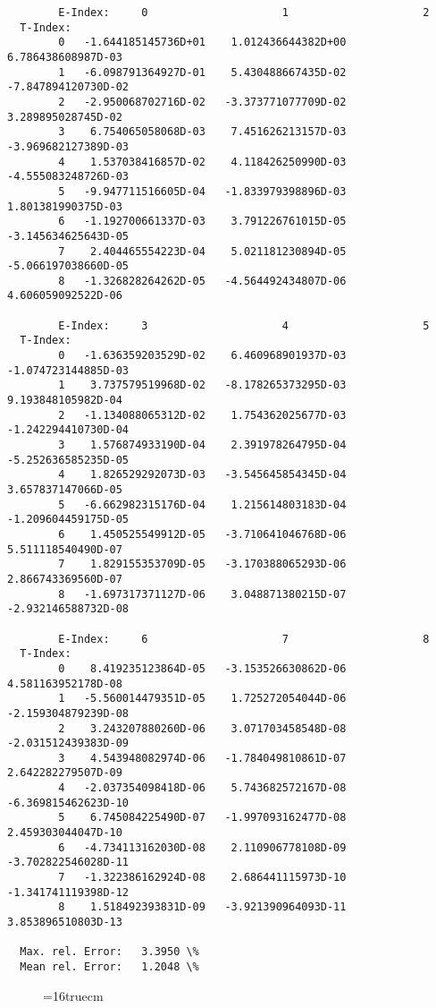 \documentclass[12pt,dvipdfmx]{article}
\begin{document}
\begin{small}\begin{verbatim}
        E-Index:     0                     1                     2
  T-Index:
        0   -1.644185145736D+01    1.012436644382D+00    6.786438608987D-03
        1   -6.098791364927D-01    5.430488667435D-02   -7.847894120730D-02
        2   -2.950068702716D-02   -3.373771077709D-02    3.289895028745D-02
        3    6.754065058068D-03    7.451626213157D-03   -3.969682127389D-03
        4    1.537038416857D-02    4.118426250990D-03   -4.555083248726D-03
        5   -9.947711516605D-04   -1.833979398896D-03    1.801381990375D-03
        6   -1.192700661337D-03    3.791226761015D-05   -3.145634625643D-05
        7    2.404465554223D-04    5.021181230894D-05   -5.066197038660D-05
        8   -1.326828264262D-05   -4.564492434807D-06    4.606059092522D-06

        E-Index:     3                     4                     5
  T-Index:
        0   -1.636359203529D-02    6.460968901937D-03   -1.074723144885D-03
        1    3.737579519968D-02   -8.178265373295D-03    9.193848105982D-04
        2   -1.134088065312D-02    1.754362025677D-03   -1.242294410730D-04
        3    1.576874933190D-04    2.391978264795D-04   -5.252636585235D-05
        4    1.826529292073D-03   -3.545645854345D-04    3.657837147066D-05
        5   -6.662982315176D-04    1.215614803183D-04   -1.209604459175D-05
        6    1.450525549912D-05   -3.710641046768D-06    5.511118540490D-07
        7    1.829155353709D-05   -3.170388065293D-06    2.866743369560D-07
        8   -1.697317371127D-06    3.048871380215D-07   -2.932146588732D-08

        E-Index:     6                     7                     8
  T-Index:
        0    8.419235123864D-05   -3.153526630862D-06    4.581163952178D-08
        1   -5.560014479351D-05    1.725272054044D-06   -2.159304879239D-08
        2    3.243207880260D-06    3.071703458548D-08   -2.031512439383D-09
        3    4.543948082974D-06   -1.784049810861D-07    2.642282279507D-09
        4   -2.037354098418D-06    5.743682572167D-08   -6.369815462623D-10
        5    6.745084225490D-07   -1.997093162477D-08    2.459303044047D-10
        6   -4.734113162030D-08    2.110906778108D-09   -3.702822546028D-11
        7   -1.322386162924D-08    2.686441115973D-10   -1.341741119398D-12
        8    1.518492393831D-09   -3.921390964093D-11    3.853896510803D-13

  Max. rel. Error:   3.3950 \%
  Mean rel. Error:   1.2048 \%

\end{verbatim}\end{small}
\begin{figure} \label{2.2.14d}
\epsfxsize=16truecm
\end{figure}
\newpage
\end{document}
